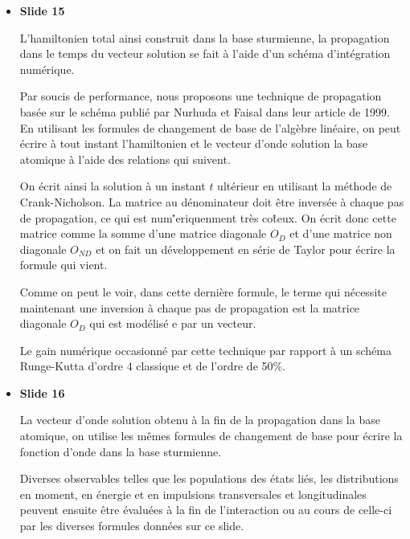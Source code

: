 \documentclass[10pt,a4paper]{article}
\begin{document}
\begin{itemize}
Ainsi, en ce qui concerne l'hamiltonien total $H$, on voit que seul les blocs 
$\Delta\ell=0,\pm 1$ sont occup\'es et que le nombre quantique magn\'etique 
$m$ se conserve au cours de l'approximation. 
Ces r\'esultats sont bien ceux pr\'edits par la th\'eorie
pour l'utilisation  d'une polarisation lin\'eaire 
dans l'approximation dipolaire.


\item \textbf{Slide 15}\par
L'hamiltonien total ainsi construit dans la base sturmienne, 
la propagation dans le temps du vecteur solution se fait \`a l'aide 
d'un sch\'ema d'int\'egration num\'erique.

Par soucis de performance, nous proposons une technique de propagation bas\'ee 
sur le sch\'ema publi\'e par Nurhuda et Faisal dans leur article de 1999.
En utilisant les formules de changement de base de l'alg\`ebre lin\'eaire,
on peut \'ecrire \`a tout instant l'hamiltonien et le vecteur d'onde solution
la base atomique \`a l'aide des relations qui suivent.

On \'ecrit ainsi la solution \`a un instant $t$ ult\'erieur
en utilisant la m\'ethode de Crank-Nicholson.
La matrice au d\'enominateur doit \^etre invers\'ee \`a chaque pas de 
propagation, ce qui est num\''eriquenment tr\`es co\^teux.
On \'ecrit donc cette matrice comme la somme d'une matrice diagonale 
$O_D$ et d'une matrice non diagonale $O_{ND}$ et on fait un d\'eveloppement 
en s\'erie de Taylor pour \'ecrire la formule qui vient.

Comme on peut le voir, dans cette derni\`ere formule, 
le terme qui n\'ecessite maintenant une inversion \`a chaque pas de propagation  
est la matrice diagonale $O_D$ qui est mod\'elis\'e e par un vecteur.

Le gain num\'erique occasionn\'e par cette technique par rapport \`a un sch\'ema 
Runge-Kutta d'ordre 4 classique et de l'ordre de 50\%.

\item \textbf{Slide 16}\par
La vecteur d'onde solution obtenu \`a la fin de la propagation dans la base atomique, 
on utilise les m\^emes formules de changement de base pour \'ecrire
la fonction d'onde dans la base sturmienne.

Diverses observables telles que les populations des \'etats li\'es, 
les distributions en moment, en \'energie 
et en impulsions transversales et longitudinales peuvent ensuite \^etre \'evalu\'ees
\`a la fin de l'interaction ou au cours de celle-ci 
par les diverses formules donn\'ees sur ce slide.


\end{itemize}
\end{document}
